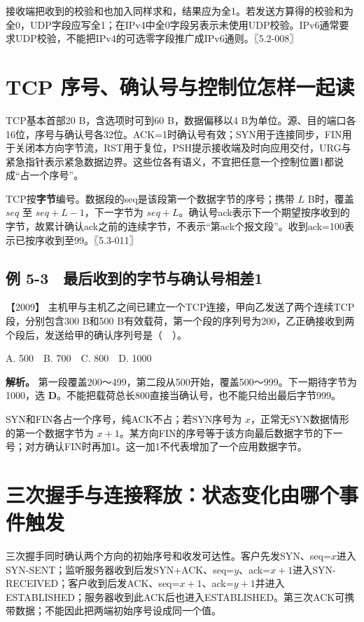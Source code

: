 接收端把收到的校验和也加入同样求和，结果应为全1。若发送方算得的校验和为全0，UDP字段应写全1；在IPv4中全0字段另表示未使用UDP校验。IPv6通常要求UDP校验，不能把IPv4的可选零字段推广成IPv6通则。〖5.2-008〗

\section{TCP 序号、确认号与控制位怎样一起读}\label{cn-05-04}

TCP基本首部20 B，含选项时可到60 B，数据偏移以4 B为单位。源、目的端口各16位，序号与确认号各32位。ACK=1时确认号有效；SYN用于连接同步，FIN用于关闭本方向字节流，RST用于复位，PSH提示接收端及时向应用交付，URG与紧急指针表示紧急数据边界。这些位各有语义，不宜把任意一个控制位置1都说成``占一个序号''。

TCP按\textbf{字节}编号。数据段的seq是该段第一个数据字节的序号；携带 \(L\) B时，覆盖 \(seq\) 至 \(seq+L-1\)，下一字节为 \(seq+L\)。确认号ack表示下一个期望按序收到的字节，故累计确认ack之前的连续字节，不表示``第ack个报文段''。收到ack=100表示已按序收到至99。〖5.3-011〗

\subsection{例 5-3　最后收到的字节与确认号相差1}\label{cn-ex5-3}

\noindent{}【2009】 主机甲与主机乙之间已建立一个TCP连接，甲向乙发送了两个连续TCP段，分别包含300 B和500 B有效载荷，第一个段的序列号为200，乙正确接收到两个段后，发送给甲的确认序列号是（　）。

A. 500　B. 700　C. 800　D. 1000


\textbf{解析。} 第一段覆盖200～499，第二段从500开始，覆盖500～999。下一期待字节为1000，选 \textbf{D}。不能把载荷总长800直接当确认号，也不能只给出最后字节999。

SYN和FIN各占一个序号，纯ACK不占；若SYN序号为 \(x\)，正常无SYN数据情形的第一个数据字节为 \(x+1\)。某方向FIN的序号等于该方向最后数据字节的下一号；对方确认FIN时再加1。这一加1不代表增加了一个应用数据字节。

\section{三次握手与连接释放：状态变化由哪个事件触发}\label{cn-05-05}

三次握手同时确认两个方向的初始序号和收发可达性。客户先发SYN、seq=\(x\)进入SYN-SENT；监听服务器收到后发SYN+ACK、seq=\(y\)、ack=\(x+1\)进入SYN-RECEIVED；客户收到后发ACK、seq=\(x+1\)、ack=\(y+1\)并进入ESTABLISHED；服务器收到此ACK后也进入ESTABLISHED。第三次ACK可携带数据；不能因此把两端初始序号设成同一个值。

